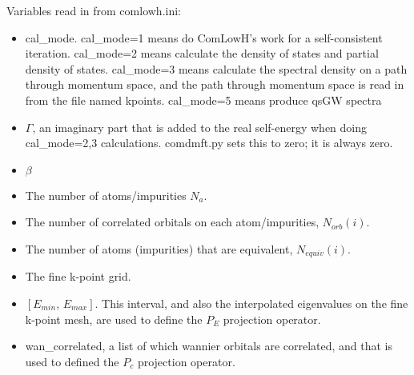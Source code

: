 \documentclass[aps,prb,singlecolumn,preprintnumbers,amsmath,amssymb]{revtex4}
\begin{document}
Variables read in from comlowh.ini:
\begin{itemize}
\item cal\_mode. cal\_mode=1 means do ComLowH's work for a self-consistent iteration.  cal\_mode=2 means calculate the density of states and partial density of states.  cal\_mode=3 means calculate the spectral density on a path through momentum space, and the path through momentum space is read in from the file named kpoints. cal\_mode=5 means produce qsGW spectra
\item $\Gamma$, an imaginary part that is added to the real self-energy when doing cal\_mode=2,3 calculations. comdmft.py sets this to zero; it is always zero. %
\item $\beta$ %
\item The number of atoms/impurities $N_a$.
\item  The number of correlated orbitals on each atom/impurities, $N_{orb}(i)$. %
\item The number of atoms (impurities) that are equivalent, $N_{equiv}(i)$. %
\item The fine k-point grid. %
\item $[E_{min}, \, E_{max}]$. This interval, and also the interpolated eigenvalues on the fine k-point mesh,  are used to define  the $ P_E$ projection operator.  
\item wan\_correlated, a list of which wannier orbitals are correlated, and that is used to defined the $P_c$ projection operator.
\end{itemize}
\end{document}
